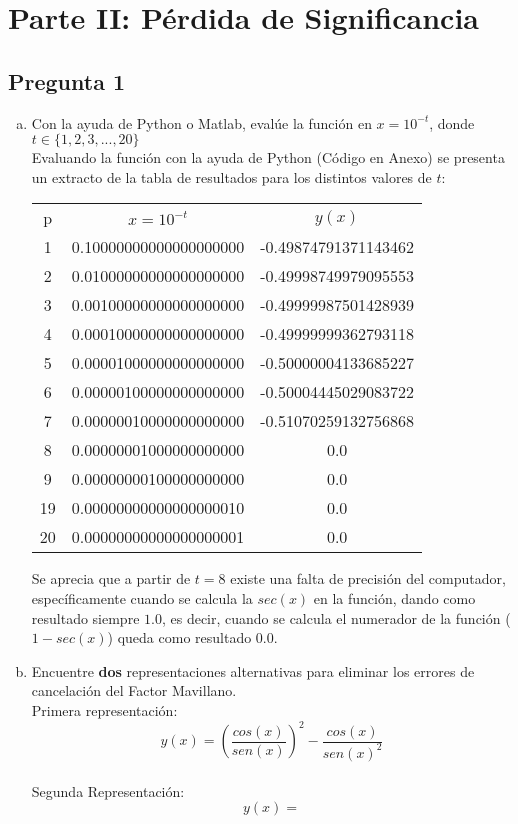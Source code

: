 \documentclass[10pt]{article}
\begin{document}
\section{Parte II: Pérdida de Significancia}

\subsection{Pregunta 1}
\begin{enumerate}[a)]
\item Con la ayuda de Python o Matlab, evalúe la función en $x=10^{-t}$, donde $t \in \{1, 2, 3,...,20\}$ \\
Evaluando la función con la ayuda de Python (Código en Anexo) se presenta un extracto de la tabla de resultados para los distintos valores de $t$:
\begin{center}
\begin{tabular}{|c|c|c|}
\cline{1-3}
p & $x=10^{-t}$ & $y(x)$  \\
\cline{1-3}
1 & 0.10000000000000000000 & -0.49874791371143462 \\
\cline{1-3}
2 & 0.01000000000000000000 & -0.49998749979095553 \\
\cline{1-3}
3 & 0.00100000000000000000 & -0.49999987501428939 \\
\cline{1-3}
4 & 0.00010000000000000000 & -0.49999999362793118 \\
\cline{1-3}
5 & 0.00001000000000000000 & -0.50000004133685227 \\
\cline{1-3}
6 & 0.00000100000000000000 & -0.50004445029083722 \\
\cline{1-3}
7 & 0.00000010000000000000 & -0.51070259132756868 \\
\cline{1-3}
8 & 0.00000001000000000000 & 0.0 \\
\cline{1-3}
9 & 0.00000000100000000000 & 0.0 \\
\cline{1-3}
19 & 0.00000000000000000010 & 0.0 \\
\cline{1-3}
20 & 0.00000000000000000001 & 0.0 \\
\cline{1-3}
\end{tabular}
\end{center}

Se aprecia que a partir de $t=8$ existe una falta de precisión del computador, específicamente cuando se calcula la $sec(x)$ en la función, dando como resultado siempre $1.0$, es decir, cuando se calcula el numerador de la función ($1-sec(x)$) queda como resultado $0.0$.

\item Encuentre \textbf{dos} representaciones alternativas para eliminar los errores de cancelación del Factor Mavillano. \\
Primera representación:
$$y(x)= \left(\frac{cos(x)}{sen(x)}\right)^2 - \frac{cos(x)}{sen(x)^2}$$ \\
Segunda Representación:
$$y(x)=$$


\end{enumerate}
\end{document}
